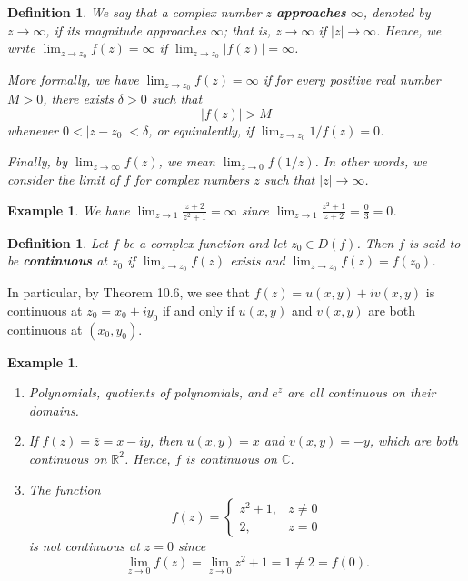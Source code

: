 \documentclass[10pt]{article}
\newcommand{\R}{\mathbb{R}}
\newcommand{\C}{\mathbb{C}}
\theoremstyle{newstyle}
\newtheorem{defn}[thm]{Definition}
\newtheorem{exmp}[thm]{Example}
\begin{document}
\begin{defn}
We say that a complex number $z$ {\bf approaches} $\infty$, denoted by $z \to \infty$, if its 
magnitude approaches $\infty$; that is, $z \to \infty$ if $|z| \to \infty$. Hence, we write 
$\lim_{z\to z_0} f(z) = \infty$ if $\lim_{z\to z_0} |f(z)| = \infty$. 

More formally, we have $\lim_{z\to z_0} f(z) = \infty$ if for every positive real number $M > 0$, 
there exists $\delta > 0$ such that 
\[ |f(z)| > M \]
whenever $0 < |z - z_0| < \delta$, or equivalently, if $\lim_{z\to z_0} 1/f(z) = 0$. 

Finally, by $\lim_{z\to\infty} f(z)$, we mean $\lim_{z\to0} f(1/z)$. In other words, 
we consider the limit of $f$ for complex numbers $z$ such that $|z| \to \infty$. 
\end{defn}

\begin{exmp}
We have $\lim_{z\to1} \frac{z+2}{z^2+1} = \infty$ since $\lim_{z\to1} \frac{z^2+1}{z+2} = \frac03 = 0$. 
\end{exmp}

\begin{defn}
Let $f$ be a complex function and let $z_0 \in D(f)$. Then $f$ is said to be {\bf continuous} 
at $z_0$ if $\lim_{z\to z_0} f(z)$ exists and $\lim_{z\to z_0} f(z) = f(z_0)$. 
\end{defn}

In particular, by Theorem 10.6, we see that $f(z) = u(x, y) + iv(x, y)$ is continuous 
at $z_0 = x_0 + iy_0$ if and only if $u(x, y)$ and $v(x, y)$ are both continuous at $(x_0, y_0)$. 

\begin{exmp}~
\begin{enumerate}[(1)]
    \item Polynomials, quotients of polynomials, and $e^z$ are all continuous on their domains.
    \item If $f(z) = \bar{z} = x-iy$, then $u(x, y) = x$ and $v(x, y) = -y$, which are both 
    continuous on $\R^2$. Hence, $f$ is continuous on $\C$. 
    \item The function 
    \[ f(z) = \begin{cases} z^2 + 1, & z \neq 0 \\ 2, & z = 0 \end{cases} \]
    is not continuous at $z = 0$ since 
    \[ \lim_{z\to0} f(z) = \lim_{z\to0} z^2 + 1 = 1 \neq 2 = f(0). \]
\end{enumerate}
\end{exmp}
\end{document}
